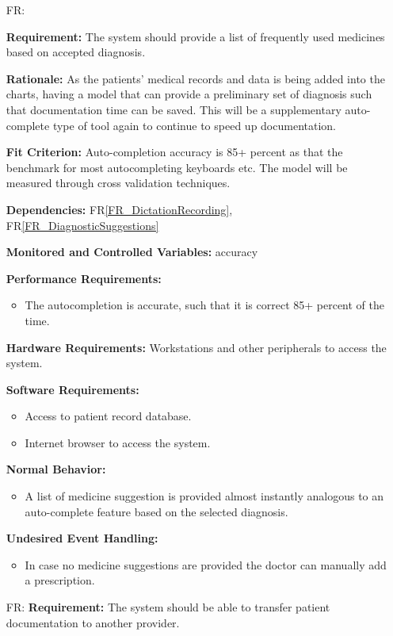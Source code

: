 \documentclass[12pt]{article}
\newcounter{reqnum} %
\begin{document}
\begin{itemize}
\item[FR\refstepcounter{reqnum}\thereqnum \label{FR_medicalSuggestions}:] 

\textbf{Requirement:} The system should provide a list of frequently used medicines based on accepted diagnosis.

\textbf{Rationale:} As the patients’ medical records and data is being added into the charts, having a model that can provide a preliminary set of diagnosis such that documentation time can be saved. This will be a supplementary auto-complete type of tool again to continue to speed up documentation.

\textbf{Fit Criterion:} Auto-completion accuracy is 85+ percent as that the benchmark for most autocompleting keyboards etc. The model will be measured through cross validation techniques.
 
\textbf{Dependencies:} FR\ref{FR_DictationRecording}, FR\ref{FR_DiagnosticSuggestions}

\textbf{Monitored and Controlled Variables:} accuracy

\textbf{Performance Requirements:}
\begin{itemize}
  \item The autocompletion is accurate, such that it is correct 85+ percent of the time. 
\end{itemize}

\textbf{Hardware Requirements:} 
Workstations and other peripherals to access the system.

\textbf{Software Requirements:}
\begin{itemize}
  \item Access to patient record database.
  \item Internet browser to access the system. 
\end{itemize}

\textbf{Normal Behavior:}
\begin{itemize}
  \item A list of medicine suggestion is provided almost instantly analogous to an auto-complete feature based on the selected diagnosis.
\end{itemize}

\textbf{Undesired Event Handling:}
\begin{itemize}
  \item In case no medicine suggestions are provided the doctor can manually add a prescription.
\end{itemize}

\item[FR\refstepcounter{reqnum}\thereqnum \label{FR_transferPatient}:] 
\textbf{Requirement:} The system should be able to transfer patient documentation to another provider. 


\end{itemize}
\end{document}
